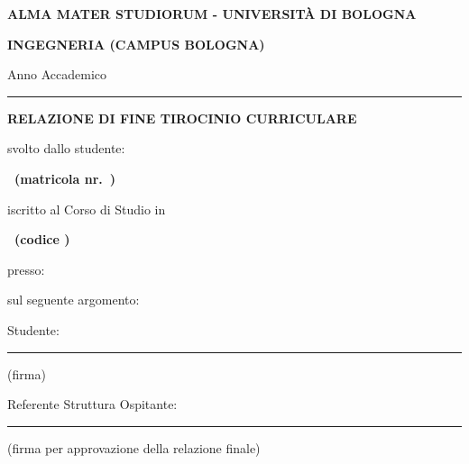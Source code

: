 \begin{titlepage}
\thispagestyle{empty}
\centering
{\small\bfseries ALMA MATER STUDIORUM - UNIVERSITÀ DI BOLOGNA\par}
\vspace{0.4cm}
{\bfseries INGEGNERIA (CAMPUS BOLOGNA)\par}
\vspace{0.4cm}
{Anno Accademico \annoAccademico\par}
\vspace{0.2cm}
\rule{\textwidth}{0.5pt}\par
\vspace{0.6cm}
{\normalsize\bfseries RELAZIONE DI FINE TIROCINIO CURRICULARE\par}
\vspace{1cm}
svolto dallo studente:\par
\vspace{0.2cm}
{\large\bfseries \studente\ (matricola nr.\ \matricola)\par}
\vspace{0.8cm}
iscritto al Corso di Studio in\par
\vspace{0.2cm}
{\large\bfseries \corso\ (codice \codiceCorso)\par}
\vspace{0.8cm}
presso:\par
\vspace{0.2cm}
{\large\bfseries \struttura\par}
\vspace{0.8cm}
sul seguente argomento:\par
\vspace{0.2cm}
{\large\bfseries \argomento\par}
\vfill
\raggedright
Studente:\par
\vspace{0.8cm}
\rule{8cm}{0.4pt}\par
{\small (firma)}\par
\vspace{1.5cm}
Referente Struttura Ospitante:\par
{\small {}\par}
\vspace{0.8cm}
\rule{8cm}{0.4pt}\par
{\small (firma per approvazione della relazione finale)}\par
\end{titlepage}
